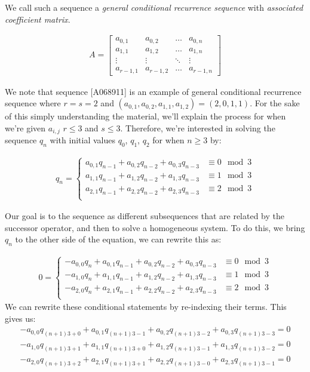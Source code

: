 \documentclass[a4paper]{article}
\theoremstyle{definition}
\begin{document}
We call such a sequence a \textit{general conditional recurrence sequence} with \textit{associated
coefficient matrix}.

\begin{align*}
A=
\begin{bmatrix}
    a_{0,1}   & a_{0,2}   & \dots  & a_{0,n} \\
    a_{1,1}   & a_{1,2}   & \dots  & a_{1,n} \\
    \vdots    & \vdots    & \ddots & \vdots  \\
    a_{r-1,1} & a_{r-1,2} & \dots  & a_{r-1,n}
\end{bmatrix}
\end{align*}

We note that sequence [A068911] is an example of general conditional recurrence sequence where $r=s=2$
and $(a_{0,1},a_{0,2},a_{1,1},a_{1,2})=(2,0,1,1)$. For the sake of this simply understanding the
material, we'll explain the process for when we're given ${a_{i,j}}$ $r \le 3$ and $s \le 3$. Therefore,
we're interested in solving the sequence $q_n$ with initial values $q_0$, $q_1$, $q_2$ for when
$n \ge 3$ by:

\begin{align*}
q_n=
\begin{cases}
a_{0,1}q_{n-1}+a_{0,2}q_{n-2}+a_{0,3}q_{n-3} & \equiv 0 \mod 3 \\
a_{1,1}q_{n-1}+a_{1,2}q_{n-2}+a_{1,3}q_{n-3} & \equiv 1 \mod 3 \\
a_{2,1}q_{n-1}+a_{2,2}q_{n-2}+a_{2,3}q_{n-3} & \equiv 2 \mod 3 \\
\end{cases}
\end{align*}

Our goal is to the sequence as different subsequences that are related by the successor operator, and
then to solve a homogeneous system. To do this, we bring $q_n$ to the other side of the equation, we can
rewrite this as:

\begin{align*}
0=
\begin{cases}
-a_{0,0}q_{n}+a_{0,1}q_{n-1}+a_{0,2}q_{n-2}+a_{0,3}q_{n-3} & \equiv 0 \mod 3 \\
-a_{1,0}q_{n}+a_{1,1}q_{n-1}+a_{1,2}q_{n-2}+a_{1,3}q_{n-3} & \equiv 1 \mod 3 \\
-a_{2,0}q_{n}+a_{2,1}q_{n-1}+a_{2,2}q_{n-2}+a_{2,3}q_{n-3} & \equiv 2 \mod 3 \\
\end{cases}
\end{align*}
We can rewrite these conditional statements by re-indexing their terms. This gives us:
\begin{align*}
-a_{0,0}q_{(n+1)3+0}+a_{0,1}q_{(n+1)3-1}
+a_{0,2}q_{(n+1)3-2}+a_{0,3}q_{(n+1)3-3} = 0 \\
-a_{1,0}q_{(n+1)3+1}+a_{1,1}q_{(n+1)3+0}
+a_{1,2}q_{(n+1)3-1}+a_{1,3}q_{(n+1)3-2} = 0 \\
-a_{2,0}q_{(n+1)3+2}+a_{2,1}q_{(n+1)3+1}
+a_{2,2}q_{(n+1)3-0}+a_{2,3}q_{(n+1)3-1} = 0
\end{align*}
\end{document}
